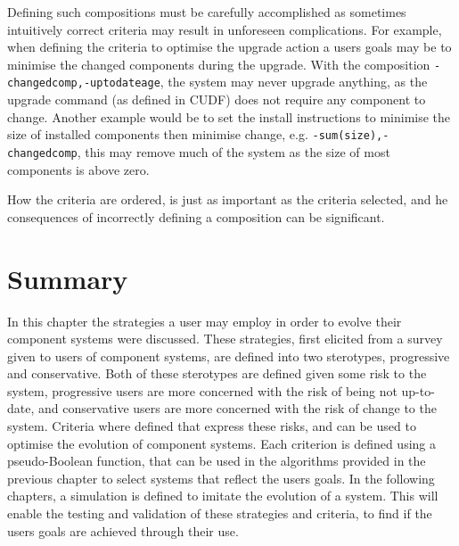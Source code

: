 Defining such compositions must be carefully accomplished as sometimes intuitively correct criteria may result in unforeseen complications.
For example, when defining the criteria to optimise the upgrade action a users goals may be to minimise the changed components during the upgrade.
With the composition \verb+-changedcomp,-uptodateage+, the system may never upgrade anything, as the upgrade command (as defined in CUDF) does not require any component to change.
Another example would be to set the install instructions to minimise the size of installed components then minimise change,
e.g. \verb!-sum(size),-changedcomp!, this may remove much of the system as the size of most components is above zero.

How the criteria are ordered, is just as important as the criteria selected, and he consequences of incorrectly defining a composition can be significant.

\section{Summary}
In this chapter the strategies a user may employ in order to evolve their component systems were discussed.
These strategies, first elicited from a survey given to users of component systems, are defined into two sterotypes, progressive and conservative.
Both of these sterotypes are defined given some risk to the system, progressive users are more concerned with the risk of being not up-to-date,
and conservative users are more concerned with the risk of change to the system.
Criteria where defined that express these risks, and can be used to optimise the evolution of component systems.
Each criterion is defined using a pseudo-Boolean function, that can be used in the algorithms provided in the previous chapter to select systems that reflect the users goals.
In the following chapters, a simulation is defined to imitate the evolution of a system.
This will enable the testing and validation of these strategies and criteria, to find if the users goals are achieved through their use. 

